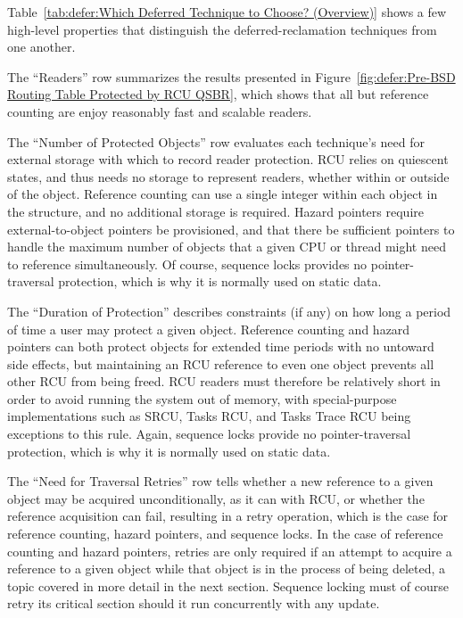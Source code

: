 Table~\ref{tab:defer:Which Deferred Technique to Choose? (Overview)}
shows a few high-level properties that distinguish the deferred-reclamation
techniques from one another.

The ``Readers'' row summarizes the results presented in
Figure~\ref{fig:defer:Pre-BSD Routing Table Protected by RCU QSBR},
which shows that all but reference counting are enjoy reasonably
fast and scalable readers.

The ``Number of Protected Objects'' row evaluates each technique's need
for external storage with which to record reader protection.
RCU relies on quiescent states, and thus needs no storage to represent
readers, whether within or outside of the object.
Reference counting can use a single integer within each object in the
structure, and no additional storage is required.
Hazard pointers require external-to-object pointers be provisioned,
and that there be sufficient pointers to handle the maximum number of
objects that a given CPU or thread might need to reference simultaneously.
Of course, sequence locks provides no pointer-traversal protection,
which is why it is normally used on static data.

\QuickQuizEnd

The ``Duration of Protection'' describes constraints (if any) on how
long a period of time a user may protect a given object.
Reference counting and hazard pointers can both protect objects for
extended time periods with no untoward side effects, but
maintaining an RCU reference to even one object prevents all other RCU
from being freed.
RCU readers must therefore be relatively short in order to avoid running
the system out of memory, with special-purpose implementations such
as SRCU, Tasks RCU, and Tasks Trace RCU being exceptions to this rule.
Again, sequence locks provide no pointer-traversal protection,
which is why it is normally used on static data.

The ``Need for Traversal Retries'' row tells whether a new reference to
a given object may be acquired unconditionally, as it can with RCU, or
whether the reference acquisition can fail, resulting in a retry
operation, which is the case for reference counting, hazard pointers,
and sequence locks.
In the case of reference counting and hazard pointers, retries are only
required if an attempt to acquire a reference to a given object while
that object is in the process of being deleted, a topic covered in more
detail in the next section.
Sequence locking must of course retry its critical section should it
run concurrently with any update.


